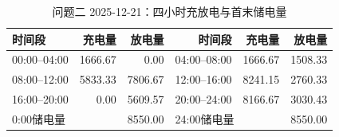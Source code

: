 \begin{table}[htbp]\centering\scriptsize
\caption{问题二 2025-12-21：四小时充放电与首末储电量}
\begin{tabular}{lrrrrr}\toprule
时间段 & 充电量 & 放电量 & 时间段 & 充电量 & 放电量\\\midrule
00:00--04:00 & 1666.67 & 0.00 & 04:00--08:00 & 1666.67 & 1508.33\\
08:00--12:00 & 5833.33 & 7806.67 & 12:00--16:00 & 8241.15 & 2760.33\\
16:00--20:00 & 0.00 & 5609.57 & 20:00--24:00 & 8166.67 & 3030.43\\
\multicolumn{2}{l}{0:00储电量} & 8550.00 & \multicolumn{2}{l}{24:00储电量} & 8550.00\\
\bottomrule\end{tabular}\end{table}

